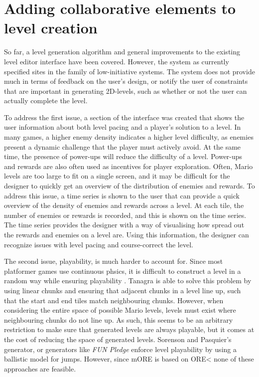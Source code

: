 \section{Adding collaborative elements to level creation}

So far, a level generation algorithm and general improvements to the existing level editor
interface have been covered. However, the system as currently specified sites in the 
family of low-initiative systems. The system does not provide much in terms of feedback on
the user's design, or notify the user of constraints that are important in generating 
2D-levels, such as whether or not the user can actually complete the level.

To address the first issue, a section of the interface was created that shows the user
information about both level pacing and a player's solution to a level. In many games,
a higher enemy density indicates a higher level difficulty, as enemies present a dynamic
challenge that the player must actively avoid. At the same time, the presence of power-ups
will reduce the difficulty of a level. Power-ups and rewards are also often used as
incentives for player exploration. Often, Mario levels are too large to fit on a single 
screen, and it may be difficult for the designer to quickly get an overview of the
distribution of enemies and rewards. To address this issue, a time series is shown to the
user that can provide a quick overview of the density of enemies and rewards across a
level. At each tile, the number of enemies or rewards is recorded, and this is shown on
the time series. The time series provides the designer with a way of visualising how
spread out the rewards and enemies on a level are. Using this information, the designer can
recognize issues with level pacing and course-correct the level.

The second issue, playability, is much harder to account for. Since most platformer games
use continuous phsics, it is difficult to construct a level in a random way while ensuring
playability \cite{smith2010}. Tanagra is able to solve this problem by using linear chunks 
and ensuring that adjacent chunks in a level line up, such that the start and end tiles
match neighbouring chunks. However, when considering the entire space of possible Mario
levels, levels must exist where neighbouring chunks do not line up. As such, this seems to
be an arbitrary restriction to make sure that generated levels are always playable, but it
comes at the cost of reducing the space of generated levels. Sorenson and Pasquier's
generator, or generators like \emph{FUN Pledge} enforce level playability by using a ballistic
model for jumps. However, since mORE is based on ORE< none of these approaches are feasible.

